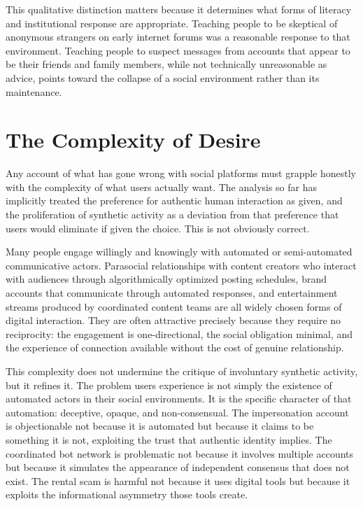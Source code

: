 \documentclass[12pt, a4paper]{article}
\begin{document}
This qualitative distinction matters because it determines what forms of literacy and institutional response are appropriate. Teaching people to be skeptical of anonymous strangers on early internet forums was a reasonable response to that environment. Teaching people to suspect messages from accounts that appear to be their friends and family members, while not technically unreasonable as advice, points toward the collapse of a social environment rather than its maintenance.

\section{The Complexity of Desire}

Any account of what has gone wrong with social platforms must grapple honestly with the complexity of what users actually want. The analysis so far has implicitly treated the preference for authentic human interaction as given, and the proliferation of synthetic activity as a deviation from that preference that users would eliminate if given the choice. This is not obviously correct.

Many people engage willingly and knowingly with automated or semi-automated communicative actors. Parasocial relationships with content creators who interact with audiences through algorithmically optimized posting schedules, brand accounts that communicate through automated responses, and entertainment streams produced by coordinated content teams are all widely chosen forms of digital interaction. They are often attractive precisely because they require no reciprocity: the engagement is one-directional, the social obligation minimal, and the experience of connection available without the cost of genuine relationship.

This complexity does not undermine the critique of involuntary synthetic activity, but it refines it. The problem users experience is not simply the existence of automated actors in their social environments. It is the specific character of that automation: deceptive, opaque, and non-consensual. The impersonation account is objectionable not because it is automated but because it claims to be something it is not, exploiting the trust that authentic identity implies. The coordinated bot network is problematic not because it involves multiple accounts but because it simulates the appearance of independent consensus that does not exist. The rental scam is harmful not because it uses digital tools but because it exploits the informational asymmetry those tools create.
\end{document}
